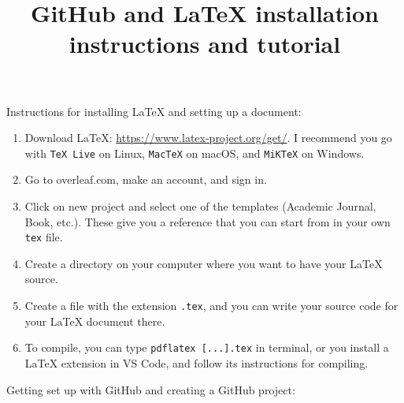 \documentclass{article}
\begin{document}
\title{GitHub and LaTeX installation instructions and tutorial}

\maketitle

Instructions for installing LaTeX and setting up a document:

\begin{enumerate}
    \item Download LaTeX: \url{https://www.latex-project.org/get/}. I recommend you go with \texttt{TeX Live} on Linux, \texttt{MacTeX} on macOS, and \texttt{MiKTeX} on Windows.
    \item Go to overleaf.com, make an account, and sign in.
    \item Click on new project and select one of the templates (Academic Journal, Book, etc.). These give you a reference that you can start from in your own \texttt{tex} file.
    \item Create a directory on your computer where you want to have your LaTeX source.
    \item Create a file with the extension \texttt{.tex}, and you can write your source code for your LaTeX document there.
    \item To compile, you can type \texttt{pdflatex [...].tex} in terminal, or you install a LaTeX extension in VS Code, and follow its instructions for compiling.
\end{enumerate}

Getting set up with GitHub and creating a GitHub project:
\end{document}
